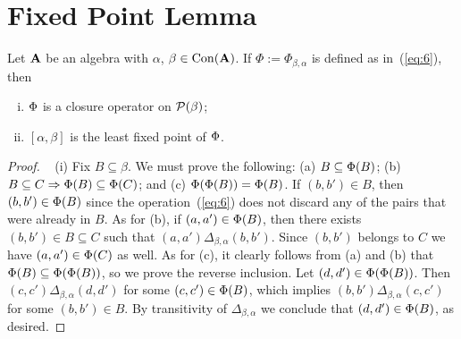 \section{Fixed Point Lemma}
\begin{lemma}
  \label{lem:fixed-point-comm}
  Let $\mathbf{A}$ be an algebra with $\alpha$, $\beta\in \operatorname{Con}(\mathbf{A})$.
  If $\Phi:=\Phi_{\beta, \alpha}$ is defined as in~(\ref{eq:6}), then 
  \begin{enumerate}[(i)]
  \item \label{item:1} $\Phi$ is a closure operator on $\mathcal{P}(\beta)$;
  \item \label{item:2} $[\alpha, \beta]$ is the least fixed point of $\Phi$.
  \end{enumerate}
\end{lemma}
\begin{proof}\
\noindent (i) Fix $B \subseteq \beta$. We must prove the following:
    (a) $B \subseteq \Phi(B)$;    
    (b) $B \subseteq C  \Rightarrow \Phi(B) \subseteq \Phi(C)$;    
    and (c) $\Phi(\Phi(B))  = \Phi(B)$.    
    If $(b,b') \in B$, then $(b,b') \in \Phi(B)$ since the
    operation~(\ref{eq:6}) does not discard any of the pairs that were already in $B$.
    As for (b), if $(a,a') \in \Phi(B)$, then there exists
    $(b,b') \in B \subseteq C$ such that $(a,a') \mathrel{\Delta_{\beta, \alpha}} (b,b')$.
    Since $(b,b')$ belongs to $C$ we have $(a,a') \in \Phi(C)$ as well.
    As for (c), it clearly follows from
    (a) and (b) that $\Phi(B)\subseteq \Phi(\Phi(B))$, so we prove the
    reverse inclusion.    
    Let $(d,d') \in \Phi(\Phi(B))$. Then
    $(c,c') \mathrel{\Delta_{\beta, \alpha}} (d,d')$ for some
    $(c,c') \in \Phi(B)$, which implies
    $(b,b') \mathrel{\Delta_{\beta, \alpha}} (c,c')$ for some
    $(b,b') \in B$.  By transitivity of $\Delta_{\beta, \alpha}$ we conclude that
    $(d,d') \in \Phi(B)$, as desired.
    \bigskip


\end{proof}
